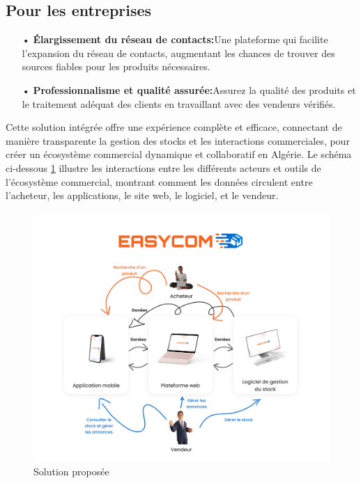 \documentclass[edit,12pt,a4paper,ChapStyle,oneside,doubleinterligne]{report}
\begin{document}
\subsection{Pour les entreprises}
\begin{itemize}
    \item [•] \textbf{Élargissement du réseau de contacts:}Une plateforme qui facilite l'expansion du réseau de contacts, augmentant les chances de trouver des sources fiables pour les produits nécessaires.
    \item [•] \textbf{Professionnalisme et qualité assurée:}Assurez la qualité des produits et le traitement adéquat des clients en travaillant avec des vendeurs vérifiés.
\end{itemize}
\phantom{hassane}
\newline
Cette solution intégrée offre une expérience complète et efficace, connectant de manière transparente la gestion des stocks et les interactions commerciales, pour créer un écosystème commercial dynamique et collaboratif en Algérie.
\newline \newline Le schéma ci-dessous \ref{fig:figure1.3} illustre les interactions entre les différents acteurs et outils de l'écosystème commercial, montrant comment les données circulent entre l'acheteur, les applications, le site web, le logiciel, et le vendeur.
\begin{figure}[h!]
    \centering
    \includegraphics[width=1\textwidth]{images/photo_2024-06-05_16-41-28.jpg}
    \caption{Solution proposée}
    \label{fig:figure1.3}
\end{figure}
\end{document}
